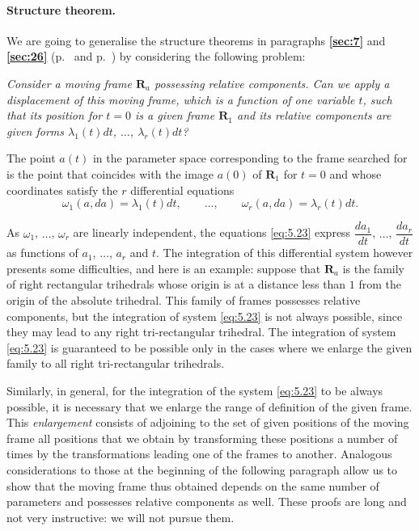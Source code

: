 \documentclass[leqno,11pt]{book}
\numberwithin{equation}{chapter}
\theoremstyle{shape1}
\theoremstyle{shapesmall}
\newcommand{\fsref}[1]{{\rm\textsection\textbf{\ref{sec:#1}}}}
\newcommand{\somespace}{\vspace{9pt}}
\begin{document}
\paragraph{Structure theorem.}
\label{sec:77}
We are going to generalise the structure theorems in paragraphs \fsref{7} and \fsref{26} (p.~\pageref{sec:7} and p.~\pageref{sec:26}) by considering the following problem:

\somespace

\emph{Consider a moving frame $\mathbf{R}_{a}$ possessing relative components. Can we apply a displacement of this moving frame, which is a function of one variable $t$, such that its position for $t=0$ is a given frame $\mathbf{R}_{1}$ and its relative components are given forms $\lambda_{1}(t)dt$, $\dots$, $\lambda_{r}(t)dt$?}

\somespace

The point $a(t)$ in the parameter space corresponding to the frame searched for is the point that coincides with the image $a(0)$ of $\mathbf{R}_{1}$ for $t=0$ and whose coordinates satisfy the $r$ differential equations
\begin{equation}
  \label{eq:5.23}
  \omega_{1}(a,da)=\lambda_{1}(t)dt,\qquad\dots,\qquad\omega_{r}(a,da)=\lambda_{r}(t)dt.
\end{equation}

As $\omega_{1}$, $\dots$, $\omega_{r}$ are linearly independent, the equations \eqref{eq:5.23} express $\dfrac{da_{1}}{dt}$, $\dots$, $\dfrac{da_{r}}{dt}$ as functions of $a_{1}$, $\dots$, $a_{r}$ and $t$. The integration of this differential system however presents some difficulties, and here is an example: suppose that $\mathbf{R}_{a}$ is the family of right rectangular trihedrals whose origin is at a distance less than $1$ from the origin of the absolute trihedral. This family of frames possesses relative components, but the integration of system \eqref{eq:5.23} is not always possible, since they may lead to any right tri-rectangular trihedral. The integration of system \eqref{eq:5.23} is guaranteed to be possible only in the cases where we enlarge the given family to all right tri-rectangular trihedrals.

Similarly, in general, for the integration of the system \eqref{eq:5.23} to be always possible, it is necessary that we enlarge the range of definition of the given frame. This \emph{enlargement} consists of adjoining to the set of given positions of the moving frame all positions that we obtain by transforming these positions a number of times by the transformations leading one of the frames to another. Analogous considerations to those at the beginning of the following paragraph allow us to show that the moving frame thus obtained depends on the same number of parameters and possesses relative components as well. These proofs are long and not very instructive: we will not pursue them.
\end{document}
